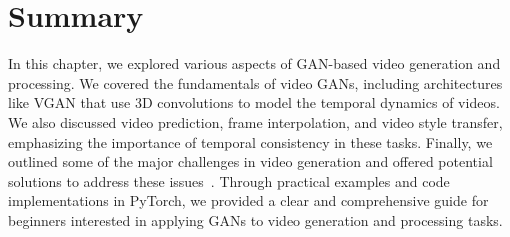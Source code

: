 \section{Summary}
In this chapter, we explored various aspects of GAN-based video generation and processing. We covered the fundamentals of video GANs, including architectures like VGAN that use 3D convolutions to model the temporal dynamics of videos. We also discussed video prediction, frame interpolation, and video style transfer, emphasizing the importance of temporal consistency in these tasks. Finally, we outlined some of the major challenges in video generation and offered potential solutions to address these issues~\cite{li2024survey}. Through practical examples and code implementations in PyTorch, we provided a clear and comprehensive guide for beginners interested in applying GANs to video generation and processing tasks.
